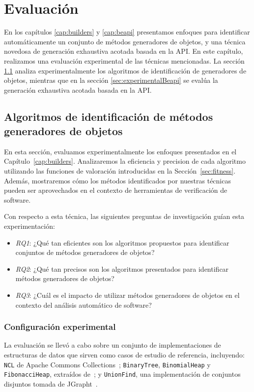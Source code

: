 \chapter[Evaluaci\'on]{Evaluaci\'on}
\label{cap:experimental}


En los capítulos \ref{cap:builders} y \ref{cap:beapi} presentamos enfoques para
identificar automáticamente un conjunto de métodos generadores de objetos, y una
técnica novedosa de generación exhaustiva acotada basada en la API. 
En este capítulo, realizamos una evaluación experimental de las técnicas
mencionadas. La sección \ref{sec:experimentalIdentificacion} analiza experimentalmente los
algoritmos de identificación de generadores de objetos, mientras que en la
sección \ref{sec:experimentalBeapi} se evalúa la generación exhaustiva acotada basada en la API.


\section{Algoritmos de identificación de métodos generadores de objetos}
\label{sec:experimentalIdentificacion}

En esta sección, evaluamos experimentalmente los enfoques presentados en el
Capítulo~\ref{cap:builders}. Analizaremos la eficiencia y precision de cada
algoritmo utilizando las funciones de valoración introducidas en la
Sección~\ref{sec:fitness}. Además, mostraremos cómo los métodos identificados
por nuestras técnicas pueden ser aprovechados en el contexto de herramientas
de verificación de software.

Con respecto a esta técnica, las siguientes preguntas de investigación guían esta experimentación:

\begin{itemize}
\item \emph{RQ1}: ¿Qué tan eficientes son los algoritmos propuestos para
    identificar conjuntos de métodos generadores de objetos?
\item \emph{RQ2}: ¿Qué tan precisos son los algoritmos presentados para identificar métodos generadores de objetos?
\item \emph{RQ3}: ¿Cuál es el impacto de utilizar métodos generadores de objetos
    en el contexto del análisis automático de software?
\end{itemize}

\subsection{Configuración experimental}
\label{sec:experimentalIdentificacionConfig}
La evaluación se llevó a cabo sobre un conjunto de implementaciones de
estructuras de datos que sirven como casos de estudio de referencia,
incluyendo: \verb"NCL" de Apache Commons Collections~\cite{apache};
\verb"BinaryTree", \verb"BinomialHeap" y \verb"FibonacciHeap", extraídos
de~\cite{Visser:2006}; y \verb"UnionFind", una implementación de conjuntos
disjuntos tomada de JGrapht~\cite{jgrapht}.

